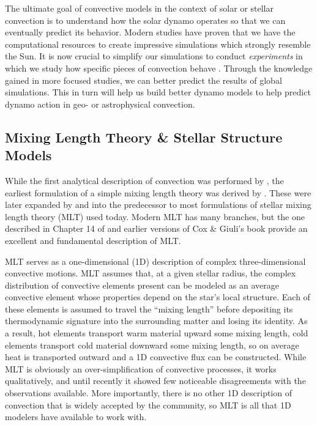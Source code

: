 The ultimate goal of convective models in the context of solar or stellar convection is to understand how the solar dynamo operates so that we can eventually predict its behavior.
Modern studies have proven that we have the computational resources to create impressive simulations which strongly resemble the Sun.
It is now crucial to simplify our simulations to conduct \emph{experiments} in which we study how specific pieces of convection behave \citep[such as in the studies of tachocline interactions of][]{wood&brummell2018}.
Through the knowledge gained in more focused studies, we can better predict the results of global simulations.
This in turn will help us build better dynamo models to help predict dynamo action in geo- or astrophysical convection.


\subsection{Mixing Length Theory \& Stellar Structure Models}
While the first analytical description of convection was performed by \citet{rayleigh1916}, the earliest formulation of a simple mixing length theory was derived by \citet{prandtl1925}.
These were later expanded by \citet{vitense1953} and \citet{bohm-vitense1958} into the predecessor to most formulations of stellar mixing length theory (MLT) used today.
Modern MLT has many branches, but the one described in Chapter 14 of \citet{weiss&all2004} and earlier versions of Cox \& Giuli's book provide an excellent and fundamental description of MLT.

MLT serves as a one-dimensional (1D) description of complex three-dimensional convective motions.
MLT assumes that, at a given stellar radius, the complex distribution of convective elements present can be modeled as an average convective element whose properties depend on the star's local structure.
Each of these elements is assumed to travel the ``mixing length'' before depositing its thermodynamic signature into the surrounding matter and losing its identity.
As a result, hot elements transport warm material upward some mixing length, cold elements transport cold material downward some mixing length, so on average heat is transported outward and a 1D convective flux can be constructed.
While MLT is obviously an over-simplification of convective processes, it works qualitatively, and until recently it showed few noticeable disagreements with the observations available.
More importantly, there is no other 1D description of convection that is widely accepted by the community, so MLT is all that 1D modelers have available to work with.

